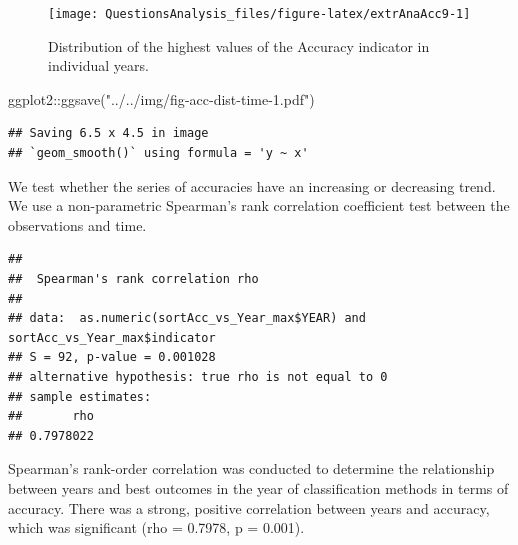 \documentclass[
]{article}
\newenvironment{Shaded}{\begin{snugshade}}{\end{snugshade}}
\newcommand{\AttributeTok}[1]{\textcolor[rgb]{0.77,0.63,0.00}{#1}}
\newcommand{\FunctionTok}[1]{\textcolor[rgb]{0.00,0.00,0.00}{#1}}
\newcommand{\NormalTok}[1]{#1}
\newcommand{\OtherTok}[1]{\textcolor[rgb]{0.56,0.35,0.01}{#1}}
\newcommand{\SpecialCharTok}[1]{\textcolor[rgb]{0.00,0.00,0.00}{#1}}
\newcommand{\StringTok}[1]{\textcolor[rgb]{0.31,0.60,0.02}{#1}}
\begin{document}
\begin{figure}

{\centering \texttt{[image: QuestionsAnalysis\_files/figure-latex/extrAnaAcc9-1]} 

}

\caption{Distribution of the highest values of the Accuracy indicator in individual years.}\label{fig:extrAnaAcc9}
\end{figure}

\begin{Shaded}
\begin{Highlighting}[]
\NormalTok{ggplot2}\SpecialCharTok{::}\FunctionTok{ggsave}\NormalTok{(}\StringTok{"../../img/fig{-}acc{-}dist{-}time{-}1.pdf"}\NormalTok{)}
\end{Highlighting}
\end{Shaded}

\begin{verbatim}
## Saving 6.5 x 4.5 in image
## `geom_smooth()` using formula = 'y ~ x'
\end{verbatim}

We test whether the series of accuracies have an increasing or decreasing trend. We use a non-parametric Spearman's rank correlation coefficient test between the observations and time.

\begin{Shaded}
\end{Shaded}

\begin{verbatim}
## 
##  Spearman's rank correlation rho
## 
## data:  as.numeric(sortAcc_vs_Year_max$YEAR) and sortAcc_vs_Year_max$indicator
## S = 92, p-value = 0.001028
## alternative hypothesis: true rho is not equal to 0
## sample estimates:
##       rho 
## 0.7978022
\end{verbatim}

Spearman's rank-order correlation was conducted to determine the relationship between years and best outcomes in the year of classification methods in terms of accuracy. There was a strong, positive correlation between years and accuracy, which was significant (rho = 0.7978, p = 0.001).
\end{document}
